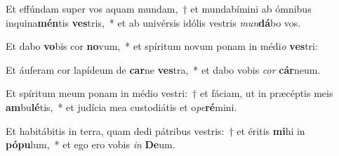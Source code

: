 \item Et effúndam super vos aquam mundam,~† et mundabímini ab ómnibus inquina\textbf{mén}tis \textbf{ves}tris,~* et ab univérsis idólis vestris \textit{mun}\textbf{dá}bo vos.
\item Et dabo \textbf{vo}bis cor \textbf{no}vum,~* et spíritum novum ponam in médi\textit{o} \textbf{ves}tri:
\item Et áuferam cor lapídeum de \textbf{car}ne \textbf{ves}tra,~* et dabo vobis \textit{cor} \textbf{cár}neum.
\item Et spíritum meum ponam in médio vestri:~† et fáciam, ut in præcéptis meis \textbf{am}bu\textbf{lé}tis,~* et judícia mea custodiátis et o\textit{pe}\textbf{ré}mini.
\item Et habitábitis in terra, quam dedi pátribus vestris:~† et éritis \textbf{mi}hi in \textbf{pó}\textbf{pu}lum,~* et ego ero vobis \textit{in} \textbf{De}um.
